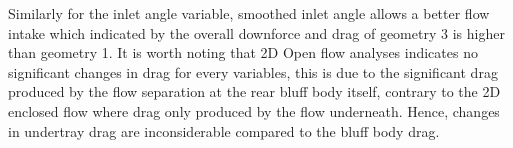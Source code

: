 \noindent Similarly for the inlet angle variable, smoothed inlet angle allows a better flow intake which indicated by the overall downforce and drag of geometry 3 is higher than geometry 1. It is worth noting that 2D Open flow analyses indicates no significant changes in drag for every variables, this is due to the significant drag produced by the flow separation at the rear bluff body itself, contrary to the 2D enclosed flow where drag only produced by the flow underneath. Hence, changes in undertray drag are inconsiderable compared to the bluff body drag.



